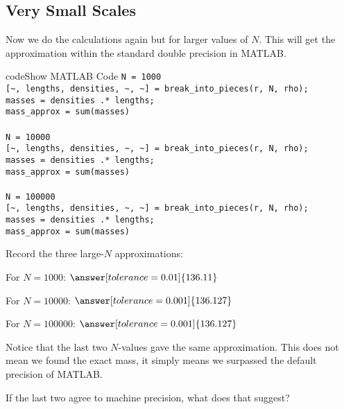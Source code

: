 \documentclass{ximera}
\begin{document}
\subsection*{Very Small Scales}

Now we do the calculations again but for larger values of $N$. This will get the approximation within the standard double precision in MATLAB.

\begin{expandable}{code}{Show MATLAB Code}
\texttt{N = 1000}\\
\texttt{[\textasciitilde, lengths, densities, \textasciitilde, \textasciitilde] = break\_into\_pieces(r, N, rho);}\\
\texttt{masses = densities .* lengths;}\\
\texttt{mass\_approx = sum(masses)}\\
\\
\texttt{N = 10000}\\
\texttt{[\textasciitilde, lengths, densities, \textasciitilde, \textasciitilde] = break\_into\_pieces(r, N, rho);}\\
\texttt{masses = densities .* lengths;}\\
\texttt{mass\_approx = sum(masses)}\\
\\
\texttt{N = 100000}\\
\texttt{[\textasciitilde, lengths, densities, \textasciitilde, \textasciitilde] = break\_into\_pieces(r, N, rho);}\\
\texttt{masses = densities .* lengths;}\\
\texttt{mass\_approx = sum(masses)}
\end{expandable}

\begin{problem}
Record the three large-$N$ approximations:

For $N=1000$: $\answer[tolerance=0.01]{136.11}$

For $N=10000$: $\answer[tolerance=0.001]{136.127}$

For $N=100000$: $\answer[tolerance=0.001]{136.127}$

Notice that the last two $N$-values gave the same approximation. This does not mean we found the exact mass, it simply means we surpassed the default precision of MATLAB.

If the last two agree to machine precision, what does that suggest? \begin{multipleChoice}
\end{multipleChoice}
\end{problem}
\end{document}
